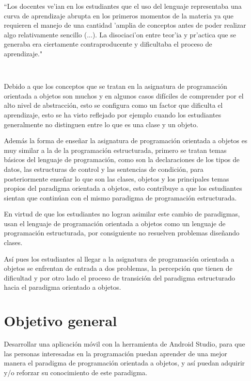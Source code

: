 \begin{minipage}{0.9\linewidth}
	 \vspace{5pt}
	 \begin{small}
	 	``Los docentes ve'ian en los estudiantes que el uso del lenguaje representaba una curva de aprendizaje abrupta en los primeros momentos de la materia ya que requieren el manejo de una cantidad 'amplia de conceptos antes de poder realizar algo relativamente sencillo (...). La disociaci'on entre teor'ia y pr'actica que se generaba era ciertamente contraproducente y dificultaba el proceso de aprendizaje."
	 \end{small}
\end{minipage}\\\newline

Debido a que los conceptos que se tratan en la asignatura de programación orientada a objetos son muchos y en algunos casos difíciles de comprender por el alto nivel de abstracción, esto se configura como un factor que dificulta el aprendizaje, esto se ha visto reflejado por ejemplo cuando los estudiantes generalmente no distinguen entre lo que es una clase y un objeto.

Además la forma de enseñar la asignatura de programación orientada a objetos es muy similar a la de la programación estructurada, primero se tratan temas básicos del lenguaje de programación, como son la declaraciones de los tipos de datos, las estructuras de control y las sentencias de condición, para posteriormente enseñar lo que son las clases, objetos y los principales temas propios del paradigma orientada a objetos, esto contribuye a que los estudiantes sientan que continúan con el mismo paradigma de programación estructurada.

En virtud de que los estudiantes no logran asimilar este cambio de paradigmas, usan el lenguaje de programación orientada a objetos como un lenguaje de programación estructurada, por consiguiente no resuelven problemas diseñando clases.

Así pues los estudiantes al llegar a la asignatura de programación orientada a objetos se enfrentan de entrada a dos problemas, la percepción que tienen de dificultad y por otro lado el proceso de transición del paradigma estructurado hacia el paradigma orientado a objetos.

\section{Objetivo general}
Desarrollar una aplicación móvil con la herramienta de Android Studio, para que las personas interesadas en la programación puedan aprender de una mejor manera el paradigma de programación orientada a objetos, y así puedan adquirir y/o reforzar su conocimiento de este paradigma. 

